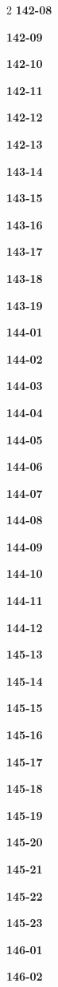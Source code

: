 \documentclass[10pt,a4paper]{article}
\begin{document}
\begin{multicols}{2}
\noindent\textbf{142-08}\ \par
\noindent\textbf{142-09}\ \par
\noindent\textbf{142-10}\ \par
\noindent\textbf{142-11}\ \par
\noindent\textbf{142-12}\ \par
\noindent\textbf{142-13}\ \par
\noindent\textbf{143-14}\ \par
\noindent\textbf{143-15}\ \par
\noindent\textbf{143-16}\ \par
\noindent\textbf{143-17}\ \par
\noindent\textbf{143-18}\ \par
\noindent\textbf{143-19}\ \par
\noindent\textbf{144-01}\ \par
\noindent\textbf{144-02}\ \par
\noindent\textbf{144-03}\ \par
\noindent\textbf{144-04}\ \par
\noindent\textbf{144-05}\ \par
\noindent\textbf{144-06}\ \par
\noindent\textbf{144-07}\ \par
\noindent\textbf{144-08}\ \par
\noindent\textbf{144-09}\ \par
\noindent\textbf{144-10}\ \par
\noindent\textbf{144-11}\ \par
\noindent\textbf{144-12}\ \par
\noindent\textbf{145-13}\ \par
\noindent\textbf{145-14}\ \par
\noindent\textbf{145-15}\ \par
\noindent\textbf{145-16}\ \par
\noindent\textbf{145-17}\ \par
\noindent\textbf{145-18}\ \par
\noindent\textbf{145-19}\ \par
\noindent\textbf{145-20}\ \par
\noindent\textbf{145-21}\ \par
\noindent\textbf{145-22}\ \par
\noindent\textbf{145-23}\ \par
\noindent\textbf{146-01}\ \par
\noindent\textbf{146-02}\ \par

\end{multicols}
\end{document}
